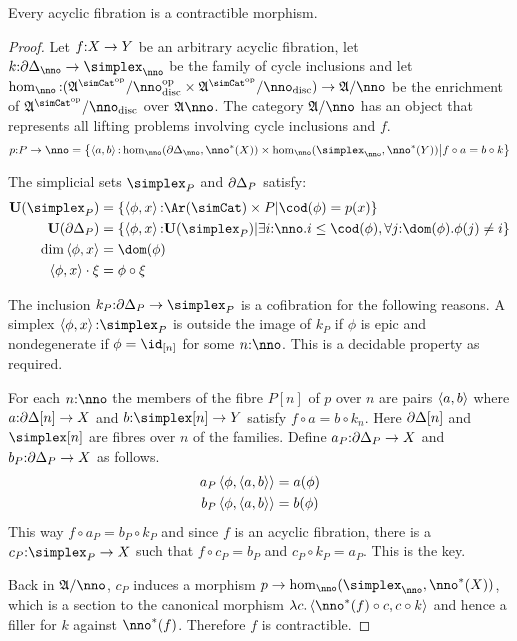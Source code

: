 \documentclass[csh.tex]{subfiles}
\begin{document}
\begin{lemma} Every acyclic fibration is a contractible morphism. \label{acyclic means contractible} \end{lemma}

\begin{proof}
Let $f\mathord : X\to Y$ be an arbitrary acyclic fibration, let $k\of\cycle_\nno\to\simplex_\nno$ be the family of cycle inclusions and 
let $\hom_\nno\of(\ambient\s/\nno\disc\dual\times \ambient\s/\nno\disc)\to \ambient/\nno$ be the enrichment of $\ambient\s/\nno\disc$ over $\ambient\nno$.
The category $\ambient/\nno$ has an object that represents all lifting problems involving cycle inclusions and $f$.
\[ p\of P\to \nno = \set{\tuplet{a,b}\of \hom_\nno(\cycle_\nno,\nno\ri(X))\times \hom_\nno(\simplex_\nno,\nno\ri(Y)) \middle|f\circ a = b\circ k} \]

The simplicial sets $\simplex_P$ and $\partial\Delta_P$ satisfy:
\begin{align*}
\base(\simplex_P) &= \set{ \tuplet{\phi,x}\of\Ar(\simCat)\times P | \cod(\phi) = p(x) } \\
\base(\cycle_P) &= \set{\tuplet{\phi,x}\of\base(\simplex_P)\middle|\exists i\of\nno.i\leq \cod(\phi),\forall j\of \dom(\phi).\phi(j)\neq i} \\
\dim\tuplet{\phi,x} &= \dom(\phi) \\
\tuplet{\phi,x}\cdot \xi &=\phi\circ\xi
\end{align*}

The inclusion $k_P\of\cycle_P\to\simplex_P$ is a cofibration for the following reasons. 
A simplex $\tuplet{\phi,x}\of\simplex_P$ is outside the image of $k_P$ if $\phi$ is epic and nondegenerate if $\phi = \id_{[n]}$ for some $n\of \nno$. This is a decidable property as required.

For each $n\of\nno$ the members of the fibre $P[n]$ of $p$ over $n$ are pairs $\left\langle a,b \right\rangle$ where $a\mathord :\partial\Delta[n]\to X$ and $b\of \simplex[n]\to Y$ satisfy $f\circ a = b \circ k_n$. Here $\partial\Delta[n]$ and $\simplex[n]$ are fibres over $n$ of the families. Define $a_P\mathord : \partial\Delta_P\to X$ and $b_P\mathord : \partial\Delta_P\to X$ as follows.
\begin{align*}
a_P\left\langle \phi,\left\langle a,b \right\rangle \right\rangle &= a(\phi)\\
b_P\left\langle \phi,\left\langle a,b \right\rangle \right\rangle &= b(\phi)
\end{align*}
This way $f\circ a_P = b_P\circ k_P$ and since $f$ is an acyclic fibration, there is a $c_P\of \simplex_P\to X$ such that $f\circ c_P = b_P$ and $c_P\circ k_P = a_P$. This is the key.

Back in $\ambient/\nno$, $c_P$ induces a morphism $p\to\hom_\nno(\simplex_\nno,\nno\ri(X))$, which is a section to the canonical morphism $\function c\tuplet{\nno\ri(f)\circ c,c\circ k}$ and hence a filler for $k$ against $\nno\ri(f)$. Therefore $f$ is contractible.
\end{proof}
\end{document}
